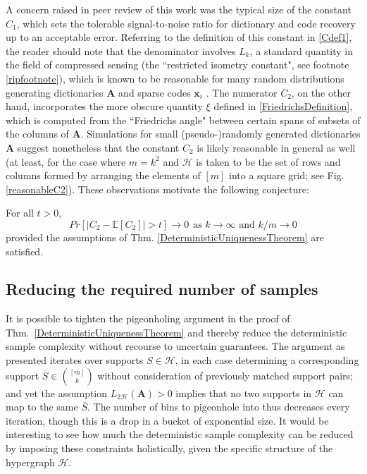 A concern raised in peer review of this work was the typical size of the constant $C_1$, which sets the tolerable signal-to-noise ratio for dictionary and code recovery up to an acceptable error. Referring to the definition of this constant in \eqref{Cdef1}, the reader should note that the denominator involves $L_k$, a standard quantity in the field of compressed sensing (the ``restricted isometry constant", see footnote \ref{ripfootnote}), which is known to be reasonable for many random distributions generating dictionaries $\mathbf{A}$ and sparse codes $\mathbf{x}_i$ \cite{baraniuk2008simple}. The numerator $C_2$, on the other hand, incorporates the more obscure quantity $\xi$ defined in \eqref{FriedrichsDefinition}, which is computed from the ``Friedrichs angle" between certain spans of subsets of the columns of $\mathbf{A}$. Simulations for small (pseudo-)randomly generated dictionaries $\mathbf{A}$ suggest nonetheless that the constant $C_2$ is likely reasonable in general as well (at least, for the case where $m=k^2$ and $\mathcal{H}$ is taken to be the set of rows and columns formed by arranging the elements of $[m]$ into a square grid; see Fig. \ref{reasonableC2}). These observations motivate the following conjecture:

\begin{conjecture}
For all $t > 0$,
\begin{equation*}
Pr[ \left| C_2- \mathbb{E}[C_2 ] \right| > t] \to 0 \ \ \text{as $k \to \infty$ and $k/m \to 0$} 
\end{equation*}
provided the assumptions of Thm. \ref{DeterministicUniquenessTheorem} are satisfied.
\end{conjecture}

\subsection{Reducing the required number of samples}

It is possible to tighten the pigeonholing argument in the proof of Thm.~\ref{DeterministicUniquenessTheorem} and thereby reduce the deterministic sample complexity without recourse to uncertain guarantees. The argument as presented iterates over supports $S \in \mathcal{H}$, in each case determining a corresponding support $\overline S \in {[\overline m] \choose k}$ without consideration of previously matched support pairs; and yet the assumption $L_{2\mathcal{H}}(\mathbf{A}) > 0$ implies that no two supports in $\mathcal{H}$ can map to the same $\overline S$. The number of bins to pigeonhole into thus decreases every iteration, though this is a drop in a bucket of exponential size. It would be interesting to see how much the deterministic sample complexity can be reduced by imposing these constraints holistically, given the specific structure of the hypergraph $\mathcal{H}$.


